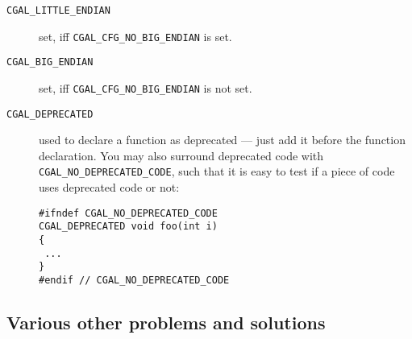 \begin{description}
\item[\texttt{CGAL\_LITTLE\_ENDIAN}] set, iff
  {\texttt{CGAL\_CFG\_NO\_BIG\_ENDIAN}} is set.
\item[\texttt{CGAL\_BIG\_ENDIAN}] set, iff
  {\texttt{CGAL\_CFG\_NO\_BIG\_ENDIAN}} is not set.

\item[\texttt{CGAL\_DEPRECATED}]
  used to declare a function as deprecated --- just add it before the
  function declaration.  You may also surround deprecated code with
  \texttt{CGAL\_NO\_DEPRECATED\_CODE}, such that it is easy to test
  if a piece of code uses deprecated code or not:
\begin{verbatim}
#ifndef CGAL_NO_DEPRECATED_CODE
CGAL_DEPRECATED void foo(int i)
{
 ...
}
#endif // CGAL_NO_DEPRECATED_CODE
\end{verbatim}
\end{description}


\subsection{Various other problems and solutions\label{sec:various_problems}}

